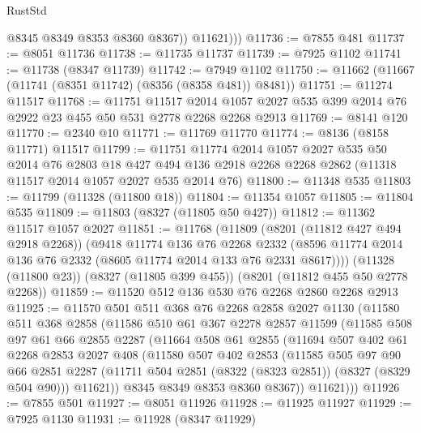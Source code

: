 \begin{lexlean}{RustStd}
\begin{coremodule}
              @8345
              @8349
              @8353
              @8360
              @8367))
          @11621)))
@11736 := @7855 @481
@11737 := @8051 @11736
@11738 := @11735 @11737
@11739 := @7925 @1102
@11741 := @11738 (@8347 @11739)
@11742 := @7949 @1102
@11750 := @11662 (@11667 (@11741 (@8351 @11742) (@8356 (@8358 @481)) @8481))
@11751 := @11274 @11517
@11768 := @11751
    @11517
    @2014
    @1057
    @2027
    @535
    @399
    @2014
    @76
    @2922
    @23
    @455
    @50
    @531
    @2778
    @2268
    @2268
    @2913
@11769 := @8141 @120
@11770 := @2340 @10
@11771 := @11769 @11770
@11774 := @8136 (@8158 @11771) @11517
@11799 := @11751
    @11774
    @2014
    @1057
    @2027
    @535
    @50
    @2014
    @76
    @2803
    @18
    @427
    @494
    @136
    @2918
    @2268
    @2268
    @2862
    (@11318 @11517 @2014 @1057 @2027 @535 @2014 @76)
@11800 := @11348 @535
@11803 := @11799 (@11328 (@11800 @18))
@11804 := @11354 @1057
@11805 := @11804 @535
@11809 := @11803 (@8327 (@11805 @50 @427))
@11812 := @11362 @11517 @1057 @2027
@11851 := @11768
    (@11809
      (@8201 (@11812 @427 @494 @2918 @2268))
      (@9418
        @11774
        @136
        @76
        @2268
        @2332
        (@8596 @11774 @2014 @136 @76 @2332 (@8605 @11774 @2014 @133 @76 @2331 @8617))))
    (@11328 (@11800 @23))
    (@8327 (@11805 @399 @455))
    (@8201 (@11812 @455 @50 @2778 @2268))
@11859 := @11520 @512 @136 @530 @76 @2268 @2860 @2268 @2913
@11925 := @11570
    @501
    @511
    @368
    @76
    @2268
    @2858
    @2027
    @1130
    (@11580
      @511
      @368
      @2858
      (@11586
        @510
        @61
        @367
        @2278
        @2857
        @11599
        (@11585
          @508
          @97
          @61
          @66
          @2855
          @2287
          (@11664
            @508
            @61
            @2855
            (@11694
              @507
              @402
              @61
              @2268
              @2853
              @2027
              @408
              (@11580
                @507
                @402
                @2853
                (@11585
                  @505
                  @97
                  @90
                  @66
                  @2851
                  @2287
                  (@11711 @504 @2851 (@8322 (@8323 @2851)) (@8327 (@8329 @504 @90)))
                  @11621))
              @8345
              @8349
              @8353
              @8360
              @8367))
          @11621)))
@11926 := @7855 @501
@11927 := @8051 @11926
@11928 := @11925 @11927
@11929 := @7925 @1130
@11931 := @11928 (@8347 @11929)

\end{coremodule}
\end{lexlean}
